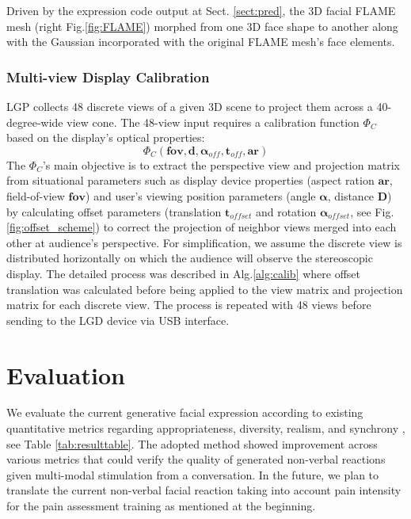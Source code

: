 \documentclass[a4paper,twocolumn]{article}
\begin{document}
Driven by the expression code output at Sect. \ref{sect:pred}, the 3D facial FLAME mesh (right Fig.\ref{fig:FLAME}) morphed from one 3D face shape to another along with the Gaussian incorporated with the original FLAME mesh's face elements.


\subsubsection{Multi-view Display Calibration}

LGP collects 48 discrete views of a given 3D scene to project them across a 40-degree-wide view cone. The 48-view input requires a calibration function $\Phi_C$ based on the display's optical properties:
$$
\Phi_C(\mathbf{fov}, \mathbf d, \mathbf \alpha_{off}, \mathbf{t}_{off}, \mathbf{ar})
$$
The $\Phi_C$'s main objective is to extract the perspective view and projection matrix from situational parameters such as display device properties (aspect ration $\mathbf{ar}$, field-of-view $\mathbf{fov}$) and user's viewing position parameters (angle $\mathbf\alpha$, distance $\mathbf D$) by calculating offset parameters (translation $\mathbf{t}_{offset}$ and rotation $\mathbf \alpha_{offset}$, see Fig.\ref{fig:offset_scheme}) to correct the projection of neighbor views merged into each other at audience's perspective. For simplification, we assume the discrete view is distributed horizontally on which the audience will observe the stereoscopic display. The detailed process was described in Alg.\ref{alg:calib} where offset translation was calculated before being applied to the view matrix and projection matrix for each discrete view. The process is repeated with 48 views before sending to the LGD device via USB interface. 

\section{Evaluation}

We evaluate the current generative facial expression according to existing quantitative metrics regarding appropriateness, diversity, realism, and synchrony \cite{song2024react}, see Table \ref{tab:resulttable}. The adopted method showed improvement across various metrics that could verify the quality of generated non-verbal reactions given multi-modal stimulation from a conversation. In the future, we plan to translate the current non-verbal facial reaction taking into account pain intensity for the pain assessment training as mentioned at the beginning.
\end{document}
